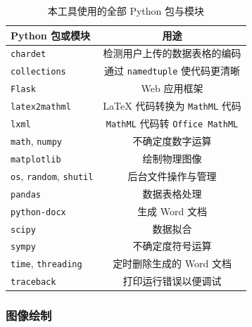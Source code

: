 \begin{table}[htbp]
  \caption{本工具使用的全部 Python 包与模块}
  \label{tab:pkg}
  \vskip 0.1in
  \centering\small
  \begin{tabular}{lc}
  \toprule
  Python 包或模块 & 用途 \\
  \midrule
  \verb|chardet| & 检测用户上传的数据表格的编码 \\
  \verb|collections| & 通过 \verb|namedtuple| 使代码更清晰 \\
  \verb|Flask| & Web 应用框架 \\
  \verb|latex2mathml| & \LaTeX{} 代码转换为 \verb|MathML| 代码 \\
  \verb|lxml| & \verb|MathML| 代码转 \verb|Office MathML| \\
  \verb|math|, \verb|numpy| & 不确定度数字运算 \\
  \verb|matplotlib| & 绘制物理图像 \\
  \verb|os|, \verb|random|, \verb|shutil| & 后台文件操作与管理 \\
  \verb|pandas| & 数据表格处理 \\
  \verb|python-docx| & 生成 Word 文档 \\
  \verb|scipy| & 数据拟合 \\
  \verb|sympy| & 不确定度符号运算 \\
  \verb|time|, \verb|threading| & 定时删除生成的 Word 文档 \\
  \verb|traceback| & 打印运行错误以便调试 \\
  \bottomrule
  \end{tabular}
  \vskip -0.1in
\end{table}

\subsubsection{图像绘制}

